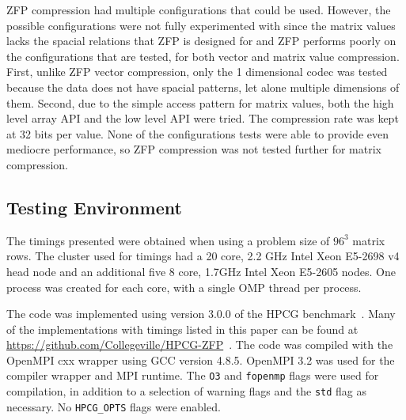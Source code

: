 ZFP compression had multiple configurations that could be used.
However, the possible configurations were not fully experimented with since the matrix values lacks the spacial relations that ZFP is designed for and ZFP performs poorly on the configurations that are tested, for both vector and matrix value compression.
First, unlike ZFP vector compression, only the 1 dimensional codec was tested because the data does not have spacial patterns, let alone multiple dimensions of them.
Second, due to the simple access pattern for matrix values, both the high level array API and the low level API were tried.
The compression rate was kept at 32 bits per value.
None of the configurations tests were able to provide even mediocre performance, so ZFP compression was not tested further for matrix compression.

\subsection{Testing Environment}
The timings presented were obtained when using a problem size of \(96^3\) matrix rows.
The cluster used for timings had a 20 core, 2.2 GHz Intel Xeon E5-2698 v4 head node and an additional five 8 core, 1.7GHz Intel Xeon E5-2605 nodes.
One process was created for each core, with a single OMP thread per process.

The code was implemented using version 3.0.0 of the HPCG benchmark~\cite{Dongarra:2015:HPCG}.
Many of the implementations with timings listed in this paper can be found at \url{https://github.com/Collegeville/HPCG-ZFP}~\cite{Lindquist:2018:projectGithub}.
The code was compiled with the OpenMPI cxx wrapper using GCC version 4.8.5.
OpenMPI 3.2 was used for the compiler wrapper and MPI runtime.
The \texttt{O3} and \texttt{fopenmp} flags were used for compilation, in addition to a selection of warning flags and the \texttt{std} flag as necessary.
No \texttt{HPCG\_OPTS} flags were enabled.